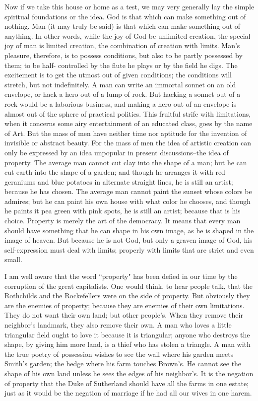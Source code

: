 \documentclass[final,10pt,letterpaper,twocolumn,openany]{book}
\begin{document}
Now if we take this house or home as a test, we may very generally
lay the simple spiritual foundations or the idea. God is that which can
make something out of nothing. Man (it may truly be said) is that which
can make something out of anything. In other words, while the joy of God
be unlimited creation, the special joy of man is limited creation, the
combination of creation with limits. Man's pleasure, therefore, is to
possess conditions, but also to be partly possessed by them; to be half-
controlled by the flute he plays or by the field he digs. The excitement is
to get the utmost out of given conditions; the conditions will stretch, but
not indefinitely. A man can write an immortal sonnet on an old envelope,
or hack a hero out of a lump of rock. But hacking a sonnet out of a rock
would be a laborious business, and making a hero out of an envelope is
almost out of the sphere of practical politics. This fruitful strife with
limitations, when it concerns some airy entertainment of an educated class,
goes by the name of Art. But the mass of men have neither time nor
aptitude for the invention of invisible or abstract beauty. For the mass of
men the idea of artistic creation can only be expressed by an idea
unpopular in present discussions--the idea of property. The average man
cannot cut clay into the shape of a man; but he can cut earth into the shape
of a garden; and though he arranges it with red geraniums and blue
potatoes in alternate straight lines, he is still an artist; because he has
chosen. The average man cannot paint the sunset whose colors be admires;
but he can paint his own house with what color he chooses, and though he
paints it pea green with pink spots, he is still an artist; because that is his
choice. Property is merely the art of the democracy. It means that every
man should have something that he can shape in his own image, as he is
shaped in the image of heaven. But because he is not God, but only a
graven image of God, his self-expression must deal with limits; properly
with limits that are strict and even small.

I am well aware that the word ``property" has been defied in our time
by the corruption of the great capitalists. One would think, to hear people
talk, that the Rothchilds and the Rockefellers were on the side of property.
But obviously they are the enemies of property; because they are enemies
of their own limitations. They do not want their own land; but other
people's. When they remove their neighbor's landmark, they also remove
their own. A man who loves a little triangular field ought to love it because
it is triangular; anyone who destroys the shape, by giving him more land,
is a thief who has stolen a triangle. A man with the true poetry of
possession wishes to see the wall where his garden meets Smith's garden;
the hedge where his farm touches Brown's. He cannot see the shape of his
own land unless he sees the edges of his neighbor's. It is the negation of
property that the Duke of Sutherland should have all the farms in one
estate; just as it would be the negation of marriage if he had all our wives
in one harem.
\end{document}
